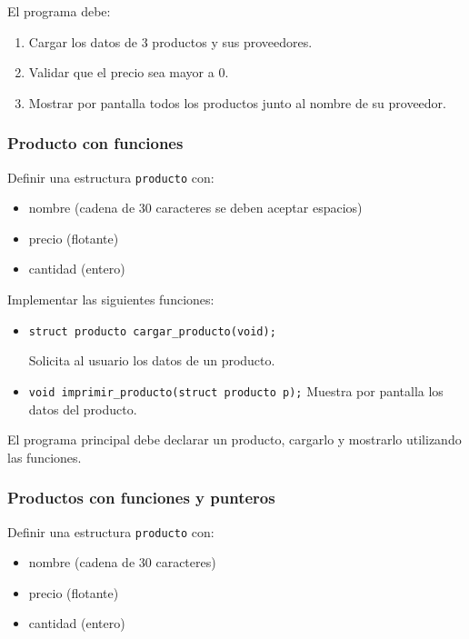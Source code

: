 El programa debe:

\begin{enumerate}
\item Cargar los datos de 3 productos y sus proveedores.
\item Validar que el precio sea mayor a 0.
\item Mostrar por pantalla todos los productos junto al nombre de su proveedor.
\end{enumerate}

\subsubsection{Producto con funciones}
Definir una estructura \texttt{producto} con:

\begin{itemize}
\item nombre (cadena de 30 caracteres se deben aceptar espacios)
\item precio (flotante)
\item cantidad (entero)
\end{itemize}

Implementar las siguientes funciones:

\begin{itemize}
\item \texttt{struct producto cargar\_producto(void);}

Solicita al usuario los datos de un producto.

\item \texttt{void imprimir\_producto(struct producto p);}
Muestra por pantalla los datos del producto.
\end{itemize}

El programa principal debe declarar un producto, cargarlo y mostrarlo utilizando las funciones.

\subsubsection{Productos con funciones y punteros}

Definir una estructura \texttt{producto} con:

\begin{itemize}
\item nombre (cadena de 30 caracteres)
\item precio (flotante)
\item cantidad (entero)
\end{itemize}

